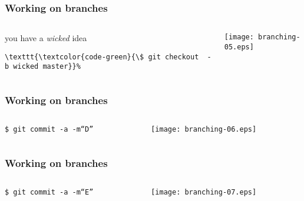 \documentclass[english]{beamer}
\newcommand{\CMD}[1]{%
\texttt{\textcolor{code-green}{#1}}%
}
\begin{document}
\begin{frame}[fragile]
\frametitle{Working on branches}

\begin{columns}[t]
        \begin{column}[T]{.5\textwidth}
                you have a {\em wicked} idea

                \vspace{\baselineskip}
                {\small
                \begin{Verbatim}[commandchars=\\\{\}]
\CMD{\$ git checkout  -b wicked master}
                \end{Verbatim}
                }

        \end{column}
        \begin{column}[T]{.5\textwidth}
                \texttt{[image: branching-05.eps]}
        \end{column}
\end{columns}
\end{frame}

\begin{frame}
\frametitle{Working on branches}

\begin{columns}[t]
        \begin{column}[T]{.5\textwidth}
                {\small
                \CMD{\$ git commit -a -m``D''} \\
                }
        \end{column}
        \begin{column}[T]{.5\textwidth}
                \texttt{[image: branching-06.eps]}
        \end{column}
\end{columns}
\end{frame}

\begin{frame}
\frametitle{Working on branches}

\begin{columns}[t]
        \begin{column}[T]{.5\textwidth}
                {\small
                \CMD{\$ git commit -a -m``E''} \\
                }
        \end{column}
        \begin{column}[T]{.5\textwidth}
                \texttt{[image: branching-07.eps]}
        \end{column}
\end{columns}
\end{frame}
\end{document}
